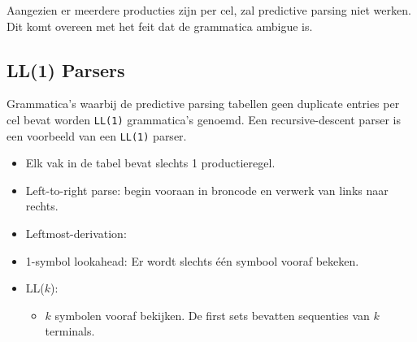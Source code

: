 Aangezien er meerdere producties zijn per cel, zal predictive parsing niet werken. Dit komt overeen met het feit dat de grammatica ambigue is.

\subsection{LL(1) Parsers}
Grammatica's waarbij de predictive parsing tabellen geen duplicate entries per cel bevat worden \texttt{LL(1)} grammatica's genoemd. Een recursive-descent parser is een voorbeeld van een \texttt{LL(1)} parser.
\begin{itemize}
	\item Elk vak in de tabel bevat slechts 1 productieregel.
	\item Left-to-right parse: begin vooraan in broncode en verwerk van links naar rechts. 
	\item Leftmost-derivation: 
	\item 1-symbol lookahead: Er wordt slechts één symbool vooraf bekeken.
	\item LL($k$):
	\begin{itemize}
		\item $k$ symbolen vooraf bekijken. De first sets bevatten sequenties van $k$ terminals.
	\end{itemize}
	

\end{itemize}
